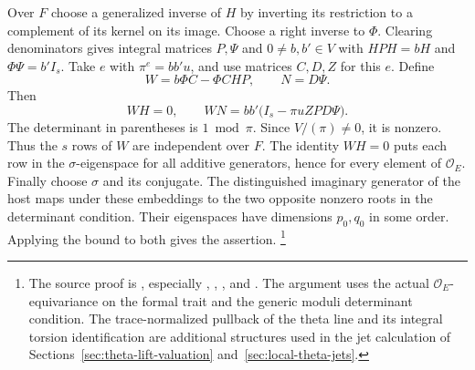Over \(F\) choose a generalized inverse of \(H\) by inverting its
restriction to a complement of its kernel on its image. Choose a
right inverse to \(\Phi\). Clearing denominators gives integral
matrices \(P,\Psi\) and \(0\ne b,b'\in V\) with
\(HPH=bH\) and \(\Phi\Psi=b'I_s\). Take \(e\) with
\(\pi^e=bb' u\), and use matrices \(C,D,Z\) for this \(e\). Define
\[
   W=b\Phi C-\Phi CH P,\qquad N=D\Psi .
\]
Then
\[
  WH=0,\qquad WN=bb'\bigl(I_s-\pi u ZP D\Psi\bigr).
\]
The determinant in parentheses is \(1\bmod \pi\). Since
\(V/(\pi)\ne0\), it is nonzero. Thus the \(s\) rows of \(W\) are
independent over \(F\). The identity \(WH=0\) puts each row in the
\(\sigma\)-eigenspace for all additive generators, hence for every
element of \(\mathcal O_E\). Finally choose \(\sigma\) and its
conjugate. The distinguished imaginary generator of the host maps
under these embeddings to the two opposite nonzero roots in the
determinant condition. Their eigenspaces have dimensions \(p_0,q_0\)
in some order. Applying the bound to both gives the assertion.
\footnote{The source proof is
\href{https://github.com/ChristianKudeba/alpoge-rh-verification/blob/alpoge-source-7cbf7a0c/src/Development/AbelianVarietyTheory/Proofs/UnitaryExistence/ExistsMulEqSmulOne.lean}{},
especially , ,
, and .
The argument uses the actual \(\mathcal O_E\)-equivariance on the
formal trait and the generic moduli determinant condition. The
trace-normalized pullback of the theta line and its integral torsion
identification are additional structures used in the jet calculation
of Sections~\ref{sec:theta-lift-valuation}
and~\ref{sec:local-theta-jets}.}
